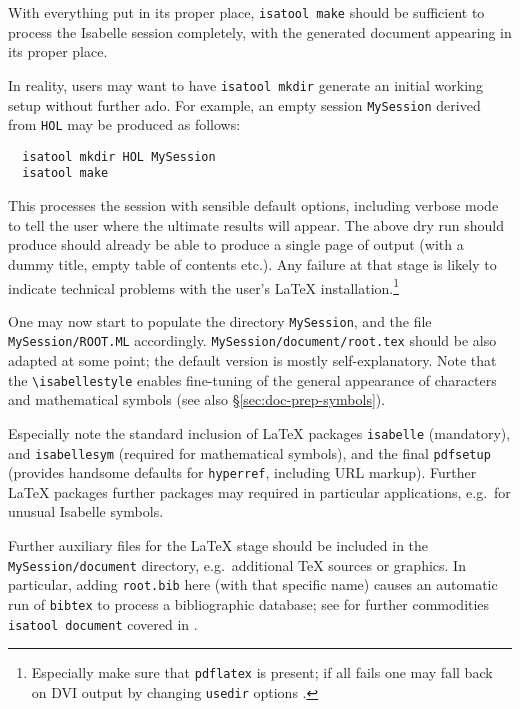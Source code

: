 \begin{isabellebody}
\begin{isamarkuptext}
\begin{itemize}
  \end{itemize}

  With everything put in its proper place, \texttt{isatool make}
  should be sufficient to process the Isabelle session completely,
  with the generated document appearing in its proper place.

  \medskip In reality, users may want to have \texttt{isatool mkdir}
  generate an initial working setup without further ado.  For example,
  an empty session \texttt{MySession} derived from \texttt{HOL} may be
  produced as follows:

\begin{verbatim}
  isatool mkdir HOL MySession
  isatool make
\end{verbatim}

  This processes the session with sensible default options, including
  verbose mode to tell the user where the ultimate results will
  appear.  The above dry run should produce should already be able to
  produce a single page of output (with a dummy title, empty table of
  contents etc.).  Any failure at that stage is likely to indicate
  technical problems with the user's {\LaTeX}
  installation.\footnote{Especially make sure that \texttt{pdflatex}
  is present; if all fails one may fall back on DVI output by changing
  \texttt{usedir} options \cite{isabelle-sys}.}

  \medskip One may now start to populate the directory
  \texttt{MySession}, and the file \texttt{MySession/ROOT.ML}
  accordingly.  \texttt{MySession/document/root.tex} should be also
  adapted at some point; the default version is mostly
  self-explanatory.  Note that the \verb,\isabellestyle, enables
  fine-tuning of the general appearance of characters and mathematical
  symbols (see also \S\ref{sec:doc-prep-symbols}).

  Especially note the standard inclusion of {\LaTeX} packages
  \texttt{isabelle} (mandatory), and \texttt{isabellesym} (required
  for mathematical symbols), and the final \texttt{pdfsetup} (provides
  handsome defaults for \texttt{hyperref}, including URL markup).
  Further {\LaTeX} packages further packages may required in
  particular applications, e.g.\ for unusual Isabelle symbols.

  \medskip Further auxiliary files for the {\LaTeX} stage should be
  included in the \texttt{MySession/document} directory, e.g.\
  additional {\TeX} sources or graphics.  In particular, adding
  \texttt{root.bib} here (with that specific name) causes an automatic
  run of \texttt{bibtex} to process a bibliographic database; see for
  further commodities \texttt{isatool document} covered in
  \cite{isabelle-sys}.


\end{isamarkuptext}
\end{isabellebody}
